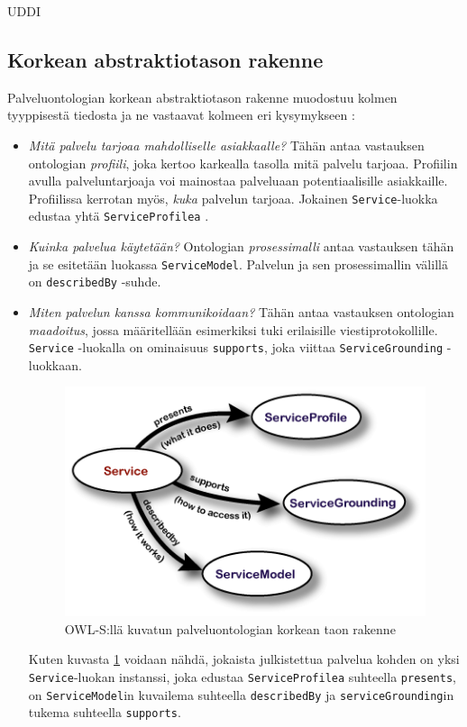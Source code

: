 \documentclass[finnish]{tktltiki2}
\theoremstyle{definition}
\theoremstyle{remark}
\begin{document}
UDDI

\subsection{Korkean abstraktiotason rakenne}

Palveluontologian korkean abstraktiotason rakenne muodostuu kolmen tyyppisestä tiedosta ja ne vastaavat kolmeen eri kysymykseen \cite{OWLS}:

\begin{itemize}

  \item \textit{Mitä palvelu tarjoaa mahdolliselle asiakkaalle?} Tähän antaa vastauksen ontologian \textit{profiili}, joka kertoo karkealla tasolla mitä palvelu tarjoaa. Profiilin 
 avulla palveluntarjoaja voi mainostaa palveluaan potentiaalisille asiakkaille. Profiilissa kerrotan myös, \textit{kuka} palvelun tarjoaa. Jokainen \texttt{Service}-luokka edustaa yhtä \texttt{ServiceProfilea} \cite{OWLS}.
 
 \item \textit{Kuinka palvelua käytetään?} Ontologian \textit{prosessimalli} antaa vastauksen tähän ja se esitetään luokassa \texttt{ServiceModel}. Palvelun ja sen prosessimallin 
 välillä on \texttt{describedBy} -suhde\cite{OWLS}. 
 
 \item \textit{Miten palvelun kanssa kommunikoidaan?} Tähän antaa vastauksen ontologian \textit{maadoitus}, jossa määritellään esimerkiksi tuki erilaisille viestiprotokollille. 
 \texttt{Service} -luokalla on ominaisuus \texttt{supports}, joka viittaa \texttt{ServiceGrounding} -luokkaan\cite{OWLS}.  
 
 \begin{figure}[ht]
 \centering
 \includegraphics[scale=0.60]{karkea_taso.png}
 \caption{OWL-S:llä kuvatun palveluontologian korkean taon rakenne \cite{OWLS}}
 \label{karkea_taso}
\end{figure}
 
 Kuten kuvasta \ref{karkea_taso}  voidaan nähdä, jokaista julkistettua palvelua kohden on yksi \texttt{Service}-luokan instanssi, joka edustaa \texttt{ServiceProfilea} suhteella \texttt{presents}, on \texttt{ServiceModel}in kuvailema suhteella \texttt{describedBy} ja \texttt{serviceGrounding}in tukema suhteella \texttt{supports}.
 
\end{itemize}
\end{document}
